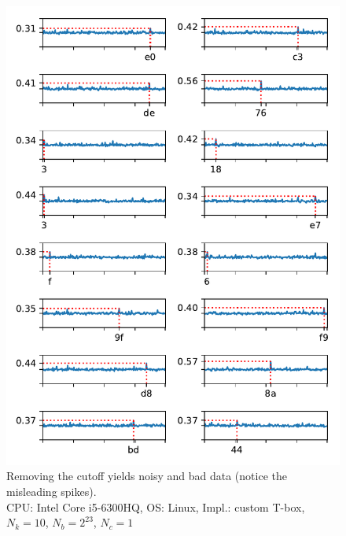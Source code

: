 \documentclass[thesis=B,english]{FITthesis}[2019/03/06]
\begin{document}
\begin{figure}
	\centering
	\includegraphics{full_nofilter_laptop.pdf}
	\caption[Unfiltered attack failure]{Removing the cutoff yields noisy and bad data (notice the misleading spikes). \\
	CPU: Intel Core i5-6300HQ, OS: Linux, Impl.: custom T-box, $N_k = 10$, $N_b = 2^{23}$, $N_c = 1$}
\end{figure}
\end{document}

